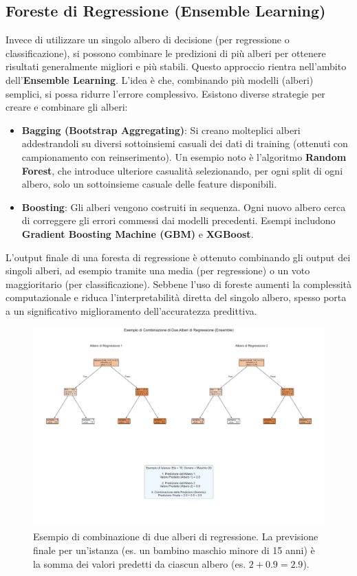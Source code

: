 \documentclass{article}
\begin{document}
\subsection{Foreste di Regressione (Ensemble Learning)}
Invece di utilizzare un singolo albero di decisione (per regressione o classificazione), si possono combinare le predizioni di più alberi per ottenere risultati generalmente migliori e più stabili. Questo approccio rientra nell'ambito dell'\textbf{Ensemble Learning}.
L'idea è che, combinando più modelli (alberi) semplici, si possa ridurre l'errore complessivo. Esistono diverse strategie per creare e combinare gli alberi:
\begin{itemize}
    \item \textbf{Bagging (Bootstrap Aggregating)}: Si creano molteplici alberi addestrandoli su diversi sottoinsiemi casuali dei dati di training (ottenuti con campionamento con reinserimento). Un esempio noto è l'algoritmo \textbf{Random Forest}, che introduce ulteriore casualità selezionando, per ogni split di ogni albero, solo un sottoinsieme casuale delle feature disponibili.
    \item \textbf{Boosting}: Gli alberi vengono costruiti in sequenza. Ogni nuovo albero cerca di correggere gli errori commessi dai modelli precedenti. Esempi includono \textbf{Gradient Boosting Machine (GBM)} e \textbf{XGBoost}.
\end{itemize}
L'output finale di una foresta di regressione è ottenuto combinando gli output dei singoli alberi, ad esempio tramite una media (per regressione) o un voto maggioritario (per classificazione). Sebbene l'uso di foreste aumenti la complessità computazionale e riduca l'interpretabilità diretta del singolo albero, spesso porta a un significativo miglioramento dell'accuratezza predittiva.

\begin{figure}[H]
    \centering
    \includegraphics[width=1\textwidth]{images/ensemble_tree_example.pdf}
    \caption{Esempio di combinazione di due alberi di regressione. La previsione finale per un'istanza (es. un bambino maschio minore di 15 anni) è la somma dei valori predetti da ciascun albero (es. $2 + 0.9 = 2.9$).}
    \label{fig:ensemble_tree_example}
\end{figure}
\end{document}
